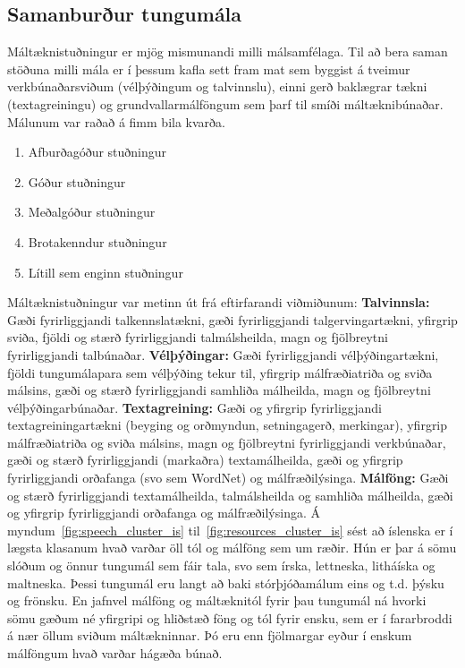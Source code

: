\documentclass{../../metanetpaper}
\begin{document}
\begin{multicols}{2}
\subsection{Samanburður tungumála}
Máltæknistuðningur er mjög mismunandi milli málsamfélaga. Til að bera saman stöðuna milli mála er í þessum kafla sett fram mat sem byggist á tveimur verkbúnaðarsviðum (vélþýðingum og talvinnslu), einni gerð baklægrar tækni (textagreiningu) og grundvallarmálföngum sem þarf til smíði máltæknibúnaðar. Málunum var raðað á fimm bila kvarða.
\begin{enumerate}
\item Afburðagóður stuðningur
\item Góður stuðningur
\item Meðalgóður stuðningur
\item Brotakenndur stuðningur
\item Lítill sem enginn stuðningur
\end{enumerate}
Máltæknistuðningur var metinn út frá eftirfarandi viðmiðunum: 
\textbf{Talvinnsla:} Gæði fyrirliggjandi talkennslatækni, gæði fyrirliggjandi talgervingartækni, yfirgrip sviða, fjöldi og stærð fyrirliggjandi talmálsheilda, magn og fjölbreytni fyrirliggjandi talbúnaðar.
\textbf{Vélþýðingar:} Gæði fyrirliggjandi vélþýðingartækni, fjöldi tungumálapara sem vélþýðing tekur til, yfirgrip málfræðiatriða og sviða málsins, gæði og stærð fyrirliggjandi samhliða málheilda, magn og fjölbreytni vélþýðingarbúnaðar.
\textbf{Textagreining:} Gæði og yfirgrip fyrirliggjandi textagreiningartækni (beyging og orðmyndun, setningagerð, merkingar), yfirgrip málfræðiatriða og sviða málsins, magn og fjölbreytni fyrirliggjandi verkbúnaðar, gæði og stærð fyrirliggjandi (markaðra) textamálheilda, gæði og yfirgrip fyrirliggjandi orðafanga (svo sem WordNet) og málfræðilýsinga.
\textbf{Málföng:} Gæði og stærð fyrirliggjandi textamálheilda, talmálsheilda og samhliða málheilda, gæði og yfirgrip fyrirliggjandi orðafanga og málfræðilýsinga. Á myndum~\ref{fig:speech_cluster_is} til~\ref{fig:resources_cluster_is} sést að íslenska er í lægsta klasanum hvað varðar öll tól og málföng sem um ræðir. Hún er þar á sömu slóðum og önnur tungumál sem fáir tala, svo sem írska, lettneska, litháíska og maltneska. Þessi tungumál eru langt að baki stórþjóðamálum eins og t.d. þýsku og frönsku. En jafnvel málföng og máltæknitól fyrir þau tungumál ná hvorki sömu gæðum né yfirgripi og hliðstæð föng og tól fyrir ensku, sem er í fararbroddi á nær öllum sviðum máltækninnar. Þó eru enn fjölmargar eyður í enskum málföngum hvað varðar hágæða búnað.

\end{multicols}
\end{document}
